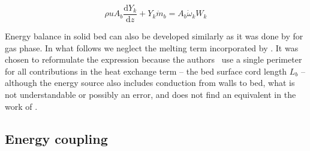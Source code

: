 \documentclass[11pt]{paper}
\newif\ifnotdraft
\begin{document}
\begin{equation}
\rho{}uA_{b}\frac{\mathrm{d}Y_{k}}{\mathrm{d}z}
+Y_{k}\dot{m}_b=
A_{b}\dot{\omega}_{k}W_{k}
\label{eq:bed-yk-continuity-final}
\end{equation}

Energy balance in solid bed can also be developed similarly as it was done by \textcite{Kee2017} for gas phase. In what follows we neglect the melting term incorporated by \textcite{Mujumdar2006i}. It was chosen to reformulate the expression because the authors~\cite{Mujumdar2006i,Mujumdar2006ii} use a single perimeter for all contributions in the heat exchange term -- the bed surface cord length $L_{b}$ -- although the energy source also includes conduction from walls to bed, what is not understandable or possibly an error, and does not find an equivalent in the work of \textcite{Hanein2017}.

\ifnotdraft
The formulated energy balance can be expressed as

\begin{equation}
\begin{aligned}
\rho{}uA_{b}c_{P}\frac{\mathrm{d}T}{\mathrm{d}z}&=
-A_{b}\sum_{k}^{N_{s}}\dot{\omega}_{k}W_{k}h_{k}
-A_{b}h\sum_{k}^{N_{s}}\dot{\omega}_{k}W_{k}\delta_{g,k}+
\dot{Q}_{b}\\
&=\dot{Q}_{b}
-A_{b}\sum_{k}^{N_{s}}\dot{\omega}_{k}W_{k}h_{k}
-h\dot{m}_{b}
\end{aligned}
\label{eq:bed-continuity-energy}
\end{equation}

The first term on right-hand side of \eqref{eq:bed-continuity-energy} refers to the energy release by chemical reactions in volume. The following provides the energy lost through gas species production, and the last accounts to heat fluxes $\dot{Q}_{w}$ across the different surfaces $w$ of perimeter $P_{w}$. For the case of a rotary kiln this includes the bed-gas and bed-wall interfaces. Care was taken so that \eqref{eq:bed-continuity-energy} keeps the same general format as the expression proposed by \textcite{Mujumdar2006i} for ease of comparison.
\fi

\subsection{Energy coupling}
\label{sec:energy-coupling}
\end{document}
